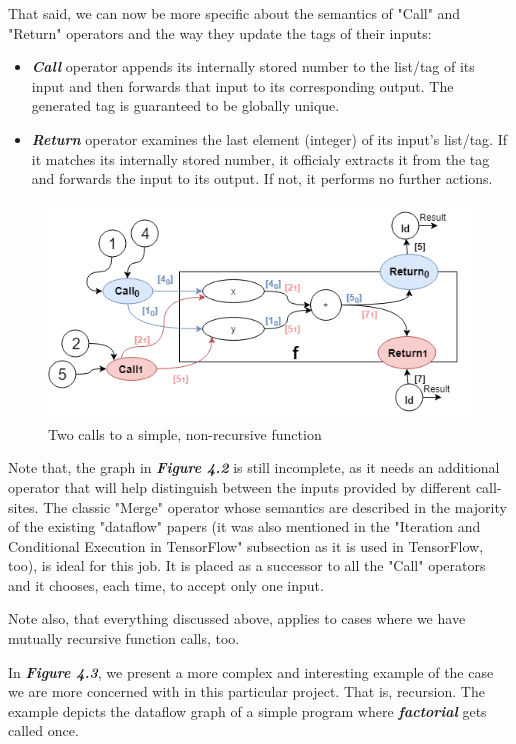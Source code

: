 \documentclass[ack,preface]{dithesis}
\begin{document}
That said, we can now be more specific about the semantics of  "Call" and "Return" operators and the way they update the tags of their inputs:
    \begin{itemize}
    \item \textit{\textbf{Call }} operator appends its internally stored number to the list/tag of its input and then forwards that input to its corresponding output. The generated tag is guaranteed to be globally unique.
    \item \textit{\textbf{Return }} operator examines the last element (integer) of its input's list/tag. If it matches its internally stored number, it officialy extracts it from the tag and forwards the input to its output. If not,  it performs no further actions.
    \end{itemize}

\begin{figure}
\centering
\includegraphics[scale=0.7]{figures/Example2}
\caption{Two calls to a simple, non-recursive function}
\end{figure}

Note that, the  graph in \textit{\textbf{Figure 4.2}} is still incomplete, as it needs an additional operator that will help distinguish between the inputs provided by different call-sites. The classic "Merge" operator whose semantics are described in the majority of  the existing "dataflow" papers (it was also mentioned in the "Iteration and Conditional Execution in TensorFlow" subsection as it is used in TensorFlow, too), is ideal for this job. It is placed as a successor to all the "Call" operators and it chooses, each time, to accept only one input.

Note also, that everything discussed above, applies to cases where we have mutually recursive function calls, too. 

In  \textit{\textbf{Figure 4.3}}, we present a more complex and interesting example of the case we are more concerned with in this particular project. That is, recursion. The example depicts the dataflow graph of a simple program where  \textit{\textbf{factorial}} gets called once.
\end{document}
